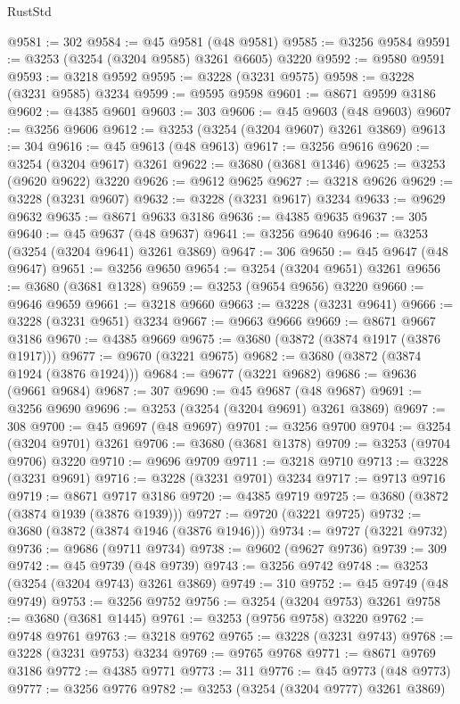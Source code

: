 \begin{lexlean}{RustStd}
\begin{coremodule}
@9581 := 302
@9584 := @45 @9581 (@48 @9581)
@9585 := @3256 @9584
@9591 := @3253 (@3254 (@3204 @9585) @3261 @6605) @3220
@9592 := @9580 @9591
@9593 := @3218 @9592
@9595 := @3228 (@3231 @9575)
@9598 := @3228 (@3231 @9585) @3234
@9599 := @9595 @9598
@9601 := @8671 @9599 @3186
@9602 := @4385 @9601
@9603 := 303
@9606 := @45 @9603 (@48 @9603)
@9607 := @3256 @9606
@9612 := @3253 (@3254 (@3204 @9607) @3261 @3869)
@9613 := 304
@9616 := @45 @9613 (@48 @9613)
@9617 := @3256 @9616
@9620 := @3254 (@3204 @9617) @3261
@9622 := @3680 (@3681 @1346)
@9625 := @3253 (@9620 @9622) @3220
@9626 := @9612 @9625
@9627 := @3218 @9626
@9629 := @3228 (@3231 @9607)
@9632 := @3228 (@3231 @9617) @3234
@9633 := @9629 @9632
@9635 := @8671 @9633 @3186
@9636 := @4385 @9635
@9637 := 305
@9640 := @45 @9637 (@48 @9637)
@9641 := @3256 @9640
@9646 := @3253 (@3254 (@3204 @9641) @3261 @3869)
@9647 := 306
@9650 := @45 @9647 (@48 @9647)
@9651 := @3256 @9650
@9654 := @3254 (@3204 @9651) @3261
@9656 := @3680 (@3681 @1328)
@9659 := @3253 (@9654 @9656) @3220
@9660 := @9646 @9659
@9661 := @3218 @9660
@9663 := @3228 (@3231 @9641)
@9666 := @3228 (@3231 @9651) @3234
@9667 := @9663 @9666
@9669 := @8671 @9667 @3186
@9670 := @4385 @9669
@9675 := @3680 (@3872 (@3874 @1917 (@3876 @1917)))
@9677 := @9670 (@3221 @9675)
@9682 := @3680 (@3872 (@3874 @1924 (@3876 @1924)))
@9684 := @9677 (@3221 @9682)
@9686 := @9636 (@9661 @9684)
@9687 := 307
@9690 := @45 @9687 (@48 @9687)
@9691 := @3256 @9690
@9696 := @3253 (@3254 (@3204 @9691) @3261 @3869)
@9697 := 308
@9700 := @45 @9697 (@48 @9697)
@9701 := @3256 @9700
@9704 := @3254 (@3204 @9701) @3261
@9706 := @3680 (@3681 @1378)
@9709 := @3253 (@9704 @9706) @3220
@9710 := @9696 @9709
@9711 := @3218 @9710
@9713 := @3228 (@3231 @9691)
@9716 := @3228 (@3231 @9701) @3234
@9717 := @9713 @9716
@9719 := @8671 @9717 @3186
@9720 := @4385 @9719
@9725 := @3680 (@3872 (@3874 @1939 (@3876 @1939)))
@9727 := @9720 (@3221 @9725)
@9732 := @3680 (@3872 (@3874 @1946 (@3876 @1946)))
@9734 := @9727 (@3221 @9732)
@9736 := @9686 (@9711 @9734)
@9738 := @9602 (@9627 @9736)
@9739 := 309
@9742 := @45 @9739 (@48 @9739)
@9743 := @3256 @9742
@9748 := @3253 (@3254 (@3204 @9743) @3261 @3869)
@9749 := 310
@9752 := @45 @9749 (@48 @9749)
@9753 := @3256 @9752
@9756 := @3254 (@3204 @9753) @3261
@9758 := @3680 (@3681 @1445)
@9761 := @3253 (@9756 @9758) @3220
@9762 := @9748 @9761
@9763 := @3218 @9762
@9765 := @3228 (@3231 @9743)
@9768 := @3228 (@3231 @9753) @3234
@9769 := @9765 @9768
@9771 := @8671 @9769 @3186
@9772 := @4385 @9771
@9773 := 311
@9776 := @45 @9773 (@48 @9773)
@9777 := @3256 @9776
@9782 := @3253 (@3254 (@3204 @9777) @3261 @3869)

\end{coremodule}
\end{lexlean}
